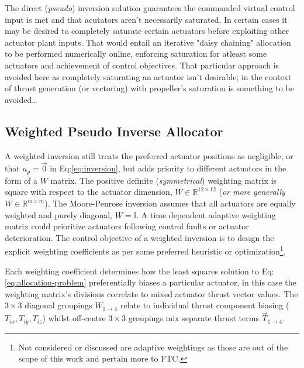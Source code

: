 {\par
The direct (\emph{pseudo}) inversion solution guarantees the commanded virtual control input is met and that acutators aren't necessarily saturated. In certain cases it may be desired to completely saturate certain actuators before exploiting other actuator plant inputs. That would entail an iterative "daisy chaining"\cite{allocation} allocation to be performed numerically online, enforcing saturation for atleast some actuators and achievement of control objectives. That particular approach is avoided here as completely saturating an actuator isn't desirable; in the context of thrust generation (or vectoring) with propeller's saturation is something to be avoided\ldots
\subsection{Weighted Pseudo Inverse Allocator}
\label{subsec:control.allocation.weightedinverse}
A weighted inversion still treats the preferred actuator positions as negligible, or that $u_p=\vec{0}$ in Eq:\ref{eq:inversion}, but adds priority to different actuators in the form of a $W$ matrix. The positive definite (\emph{symmetrical}) weighting matrix is square with respect to the actuator dimension, $W\in\mathbb{R}^{12\times 12}$ (\emph{or more generally $W\in\mathbb{R}^{m\times m}$}). The Moore-Penrose inversion assumes that all actuators are equally weighted and purely diagonal, $W=\mathbb{I}$. A time dependent adaptive weighting matrix could prioritize actuators following control faults or actuator deterioration. The control objective of a weighted inversion is to design the explicit weighting coefficients as per some preferred heuristic or optimization\footnote{Not considered or discussed are adaptive weightings as those are out of the scope of this work and pertain more to FTC\cite{FTCallocation}.}.
\par
Each weighting coefficient determines how the least squares solution to Eq:\ref{eq:allocation-problem} preferentially biases a particular actuator, in this case the weighting matrix's divisions correlate to mixed actuator thrust vector values. The $3\times 3$ diagonal groupings $W_{1\rightarrow 4}$ relate to individual thrust component biasing ($T_{ix},T_{iy},T_{iz}$) whilst off-centre $3\times 3$ groupings mix separate thrust terms $\vec{T}_{1\rightarrow 4}$. 
\par
}

